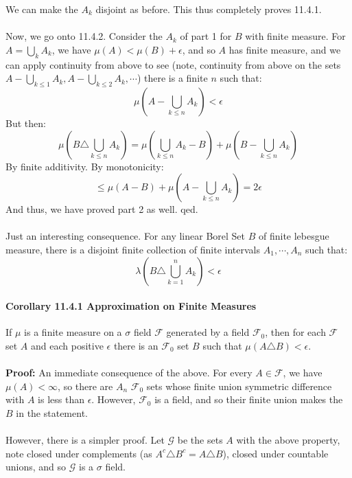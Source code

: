 \documentclass[12pt,a4paper]{article}
\newcommand{\1}[1]{\mathbbm{1}\left\{ #1 \right\}}
\newcommand{\fcal}{\mathcal{F}}
\newcommand{\gcal}{\mathcal{G}}
\begin{document}
We can make the $A_k$ disjoint as before. This thus completely proves 11.4.1.
\\\\
Now, we go onto 11.4.2. Consider the $A_k$ of part 1 for $B$ with finite measure. For $A = \bigcup_k A_k$, we have $\mu(A) < \mu(B) + \epsilon$, and so $A$ has finite measure, and we can apply continuity from above to see (note, continuity from above on the sets $A - \bigcup_{k \leq 1} A_k, A - \bigcup_{k \leq 2} A_k, \cdots$) there is a finite $n$ such that:
$$
	\mu(A - \bigcup_{k \leq n} A_k) < \epsilon
$$
But then:
$$
	\mu\left(B \triangle \bigcup_{k \leq n} A_k\right) =
	\mu\left(\bigcup_{k \leq n} A_k - B\right) + \mu\left(B - \bigcup_{k \leq n} A_k\right)
$$
By finite additivity. By monotonicity:
$$
	\leq
	\mu\left(A - B\right) + \mu\left(A - \bigcup_{k \leq n} A_k\right) = 2\epsilon
$$
And thus, we have proved part 2 as well. qed.
\\\\
Just an interesting consequence. For any linear Borel Set $B$ of finite lebesgue measure, there is a disjoint finite collection of finite intervals $A_1, \cdots, A_n$ such that:
$$
	\lambda\left(B \triangle \bigcup_{k=1}^n A_k\right) < \epsilon
$$

\paragraph{Corollary 11.4.1 Approximation on Finite Measures} If $\mu$ is a finite measure on a $\sigma$ field $\fcal$ generated by a field $\fcal_0$, then for each $\fcal$ set $A$ and each positive $\epsilon$ there is an $\fcal_0$ set $B$ such that $\mu(A \triangle B) < \epsilon$.
\\\\
\textbf{Proof:} An immediate consequence of the above. For every $A \in \fcal$, we have $\mu(A) < \infty$, so there are $A_n$ $\fcal_0$ sets whose finite union symmetric difference with $A$ is less than $\epsilon$. However, $\fcal_0$ is a field, and so their finite union makes the $B$ in the statement.
\\\\
However, there is a simpler proof. Let $\gcal$ be the sets $A$ with the above property, note closed under complements (as $A^c \triangle B^c = A \triangle B$), closed under countable unions, and so $\gcal$ is a $\sigma$ field.
\end{document}
